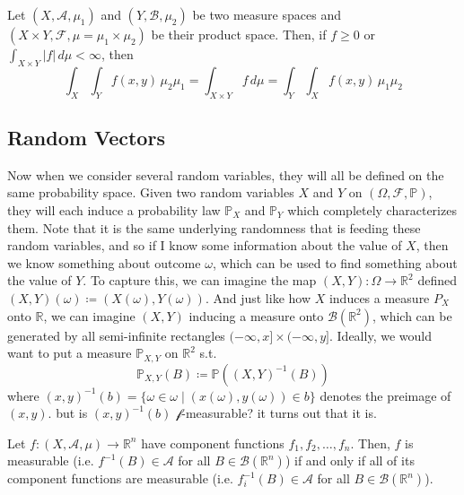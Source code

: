 \documentclass{article}
\begin{document}
      \begin{theorem}
        Let $(X, \mathcal{A}, \mu_1)$ and $(Y, \mathcal{B}, \mu_2)$ be two measure spaces and $(X \times Y, \mathcal{F}, \mu = \mu_1 \times \mu_2)$ be their product space. Then, if $f \geq 0$ or $\int_{X \times Y} |f| \,d\mu < \infty$, then 
        \begin{equation}
          \int_X \int_Y f(x, y) \, \mu_2 \mu_1 = \int_{X \times Y} f \,d\mu = \int_Y \int_X f(x, y) \, \mu_1 \mu_2
        \end{equation}
      \end{theorem}

  \subsection{Random Vectors}

    Now when we consider several random variables, they will all be defined on the same probability space. Given two random variables $X$ and $Y$ on $(\Omega, \mathcal{F}, \mathbb{P})$, they will each induce a probability law $\mathbb{P}_X$ and $\mathbb{P}_Y$ which completely characterizes them. Note that it is the same underlying randomness that is feeding these random variables, and so if I know some information about the value of $X$, then we know something about outcome $\omega$, which can be used to find something about the value of $Y$. To capture this, we can imagine the map $(X, Y) : \Omega \longrightarrow \mathbb{R}^2$ defined $(X, Y)(\omega) \coloneqq (X(\omega), Y(\omega))$. And just like how $X$ induces a measure $P_X$ onto $\mathbb{R}$, we can imagine $(X, Y)$ inducing a measure onto $\mathcal{B}(\mathbb{R}^2)$, which can be generated by all semi-infinite rectangles $(-\infty, x] \times (-\infty, y]$. Ideally, we would want to put a measure $\mathbb{P}_{X, Y}$ on $\mathbb{R}^2$ s.t. 
    \begin{equation}
      \mathbb{P}_{X, Y}(B) \coloneqq \mathbb{P}((X, Y)^{-1}(B))
    \end{equation}
    where $(x, y)^{-1}(b) = \{ \omega \in \omega \mid (x(\omega), y(\omega)) \in b\}$ denotes the preimage of $(x, y)$. but is $(x, y)^{-1}(b)$ $\mathcal{f}$-measurable? it turns out that it is. 

    \begin{theorem}
      Let $f: (X, \mathcal{A}, \mu) \longrightarrow \mathbb{R}^n$ have component functions $f_1, f_2, \ldots, f_n$. Then, $f$ is measurable (i.e. $f^{-1} (B) \in \mathcal{A}$ for all $B \in \mathcal{B}(\mathbb{R}^n)$) if and only if all of its component functions are measurable (i.e. $f_i^{-1} (B) \in \mathcal{A}$ for all $B \in \mathcal{B}(\mathbb{R}^n)$). 
    \end{theorem}
\end{document}
